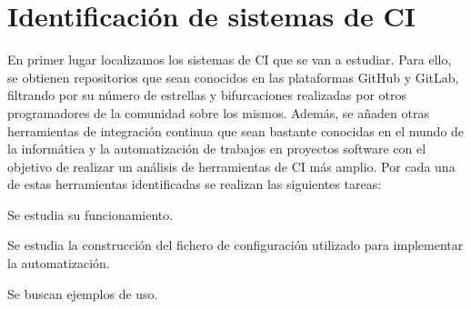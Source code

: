 \section{Identificación de sistemas de CI}
En primer lugar localizamos los sistemas de CI que se van a estudiar. Para ello, se obtienen repositorios que sean conocidos en las plataformas GitHub y GitLab, filtrando por su número de estrellas y bifurcaciones realizadas por otros programadores de la comunidad sobre los mismos. Además, se añaden otras herramientas de integración continua que sean bastante conocidas en el mundo de la informática y la automatización de trabajos en proyectos software con el objetivo de realizar un análisis de herramientas de CI más amplio.
Por cada una de estas herramientas identificadas se realizan las siguientes tareas:
\begin{compactitem}
    \item Se estudia su funcionamiento.
    \item Se estudia la construcción del fichero de configuración utilizado para implementar la automatización.
    \item Se buscan ejemplos de uso.
\end{compactitem}


